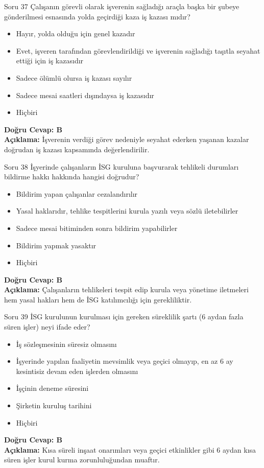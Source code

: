 \documentclass[12pt,a4paper]{article}
\begin{document}
\begin{testcard}{Soru 37}
    Çalışanın görevli olarak işverenin sağladığı araçla başka bir şubeye gönderilmesi esnasında yolda geçirdiği kaza iş kazası mıdır?
    \begin{itemize}
        \item[A)] Hayır, yolda olduğu için genel kazadır
        \item[B)] Evet, işveren tarafından görevlendirildiği ve işverenin sağladığı taşıtla seyahat ettiği için iş kazasıdır
        \item[C)] Sadece ölümlü olursa iş kazası sayılır
        \item[D)] Sadece mesai saatleri dışındaysa iş kazasıdır
        \item[E)] Hiçbiri
    \end{itemize}
    \tcblower
    \textbf{Doğru Cevap: B} \\
    \textbf{Açıklama:} İşverenin verdiği görev nedeniyle seyahat ederken yaşanan kazalar doğrudan iş kazası kapsamında değerlendirilir.
\end{testcard}

\begin{testcard}{Soru 38}
    İşyerinde çalışanların İSG kuruluna başvurarak tehlikeli durumları bildirme hakkı hakkında hangisi doğrudur?
    \begin{itemize}
        \item[A)] Bildirim yapan çalışanlar cezalandırılır
        \item[B)] Yasal haklarıdır, tehlike tespitlerini kurula yazılı veya sözlü iletebilirler
        \item[C)] Sadece mesai bitiminden sonra bildirim yapabilirler
        \item[D)] Bildirim yapmak yasaktır
        \item[E)] Hiçbiri
    \end{itemize}
    \tcblower
    \textbf{Doğru Cevap: B} \\
    \textbf{Açıklama:} Çalışanların tehlikeleri tespit edip kurula veya yönetime iletmeleri hem yasal hakları hem de İSG katılımcılığı için gerekliliktir.
\end{testcard}

\begin{testcard}{Soru 39}
    İSG kurulunun kurulması için gereken süreklilik şartı (6 aydan fazla süren işler) neyi ifade eder?
    \begin{itemize}
        \item[A)] İş sözleşmesinin süresiz olmasını
        \item[B)] İşyerinde yapılan faaliyetin mevsimlik veya geçici olmayıp, en az 6 ay kesintisiz devam eden işlerden olmasını
        \item[C)] İşçinin deneme süresini
        \item[D)] Şirketin kuruluş tarihini
        \item[E)] Hiçbiri
    \end{itemize}
    \tcblower
    \textbf{Doğru Cevap: B} \\
    \textbf{Açıklama:} Kısa süreli inşaat onarımları veya geçici etkinlikler gibi 6 aydan kısa süren işler kurul kurma zorunluluğundan muaftır.
\end{testcard}
\end{document}
